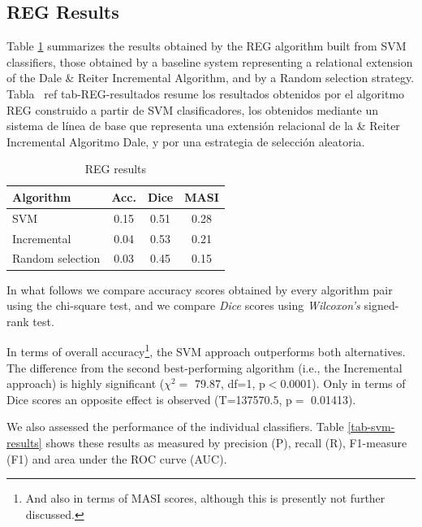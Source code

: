 \subsection{REG Results}

Table \ref{tab-reg-results} summarizes the results obtained by the REG algorithm built from SVM classifiers, those obtained by a baseline system representing a relational extension of the Dale \& Reiter Incremental Algorithm, and by a Random selection strategy.  
Tabla \ ref {tab-REG-resultados} resume los resultados obtenidos por el algoritmo REG construido a partir de SVM clasificadores, los obtenidos mediante un sistema de l\'{i}nea de base que representa una extensi\'on relacional de la \& Reiter Incremental Algoritmo Dale, y por una estrategia de selecci\'on aleatoria.

\begin{table}[ht]
\begin{center}
\caption{REG results}
\label{tab-reg-results}
\begin{tabular} {  l c c c }
\hline
{Algorithm}							& {Acc.} 	& { Dice}		& MASI \\ \hline 
SVM											& 0.15		&	0.51			& 0.28 \\
Incremental							& 0.04		&	0.53			& 0.21 \\
Random selection       	& 0.03    & 0.45      & 0.15 \\
\hline
\end{tabular}
\end{center}
\end{table}

In what follows we compare accuracy scores obtained by every algorithm pair using the chi-square test, and we compare {\em Dice} scores using {\em Wilcoxon's} signed-rank test.

In terms of overall accuracy\footnote{And also in terms of MASI scores, although this is presently not further discussed.}, the SVM approach outperforms both alternatives. The difference from the second best-performing algorithm (i.e., the Incremental approach) is highly significant ($\chi^{2}=$ 79.87, df=1, p$<$0.0001). Only in terms of Dice scores an opposite effect is observed (T=137570.5, p$=$ 0.01413). 

We also assessed the performance of the individual classifiers. Table \ref{tab-svm-results} shows these results as measured by precision (P), recall (R), F1-measure (F1) and area under the ROC curve (AUC). 


